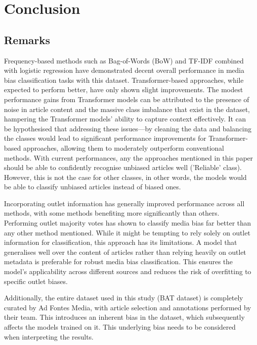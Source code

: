 \chapter{Conclusion}
\label{cha:6}

\section{Remarks}

Frequency-based methods such as Bag-of-Words (BoW) and TF-IDF combined with logistic regression have demonstrated decent overall performance in media bias classification tasks with this dataset. Transformer-based approaches, while expected to perform better, have only shown slight improvements. The modest performance gains from Transformer models can be attributed to the presence of noise in article content and the massive class imbalance that exist in the dataset, hampering the Transformer models' ability to capture context effectively. It can be hypothesised that addressing these issues—by cleaning the data and balancing the classes would lead to significant performance improvements for Transformer-based approaches, allowing them to moderately outperform conventional methods. With current performances, any the approaches mentioned in this paper should be able to confidently recognise unbiased articles well ('Reliable' class). However, this is not the case for other classes, in other words, the models would be able to classify unbiased articles instead of biased ones.

Incorporating outlet information has generally improved performance across all methods, with some methods benefiting more significantly than others. Performing outlet majority votes has shown to classify media bias far better than any other method mentioned. While it might be tempting to rely solely on outlet information for classification, this approach has its limitations. A model that generalises well over the content of articles rather than relying heavily on outlet metadata is preferable for robust media bias classification. This ensures the model's applicability across different sources and reduces the risk of overfitting to specific outlet biases.

Additionally, the entire dataset used in this study (BAT dataset) is completely curated by Ad Fontes Media, with article selection and annotations performed by their team. This introduces an inherent bias in the dataset, which subsequently affects the models trained on it. This underlying bias needs to be considered when interpreting the results.

